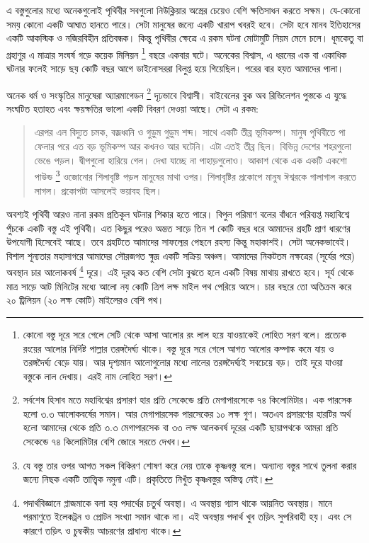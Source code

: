 \documentclass[
]{book}
\begin{document}
এ বস্তুগুলোর মধ্যে অনেকগুলোই পৃথিবীর সবগুলো নিউক্লিয়ার অস্ত্রের চেয়েও বেশি ক্ষতিসাধন করতে সক্ষম। যে-কোনো সময় কোনো একটি আঘাত হানতে পারে। সেটা মানুষের জন্যে একটি খারাপ খবরই হবে। সেটা হবে মানব ইতিহাসের একটি আকস্মিক ও নজিরবিহীন প্রতিবন্ধক। কিন্তু পৃথিবীর ক্ষেত্রে এ রকম ঘটনা মোটামুটি নিয়ম মেনে চলে। ধূমকেতু বা গ্রহাণুর এ মাত্রার সংঘর্ষ গড়ে কয়েক মিলিয়ন \footnote{কোনো বস্তু দূরে সরে গেলে সেটি থেকে আসা আলোর রং লাল হয়ে যাওয়াকেই লোহিত সরণ বলে। প্রত্যেক রংয়ের আলোর নির্দিষ্ট পাল্লার তরঙ্গদৈর্ঘ্য থাকে। বস্তু দূরে সরে গেলে আগত আলোর কম্পাঙ্ক কমে যায় ও তরঙ্গদৈর্ঘ্য বেড়ে যায়। আর দৃশ্যমান আলোগুলোর মধ্যে লালের তরঙ্গদৈর্ঘ্যই সবচেয়ে বড়। তাই দূরে যাওয়া বস্তুকে লাল দেখায়। এরই নাম লোহিত সরণ।} বছরে একবার ঘটে। অনেকের বিশ্বাস, এ ধরনের এক বা একাধিক ঘটনার ফলেই সাড়ে ছয় কোটি বছর আগে ডাইনোসররা বিলুপ্ত হয়ে গিয়েছিল। পরের বার হয়ত আমাদের পালা।

অনেক ধর্ম ও সংস্কৃতির মানুষেরা অ্যারমাগেডন \footnote{সর্বশেষ হিসাব মতে মহাবিশ্বের প্রসারণ হার প্রতি সেকেন্ডে প্রতি মেগাপারসেকে ৭৪ কিলোমিটার। এক পারসেক হলো ৩.৩ আলোকবর্ষের সমান। আর মেগাপারসেক পারসেকের ১০ লক্ষ গুণ। অতএব প্রসারণের হারটির অর্থ হলো আমাদের থেকে প্রতি ৩.৩ মেগাপারসেক বা ৩৩ লক্ষ আলকবর্ষ দূরের একটি ছায়াপথকে আমরা প্রতি সেকেন্ডে ৭৪ কিলোমিটার বেশি জোরে সরতে দেখব।} দৃঢ়ভাবে বিশ্বাসী। বাইবেলের বুক অব রিভিলেশন পুস্তকে এ যুদ্ধে সংঘটিত হতাহত এবং ক্ষয়ক্ষতির ভালো একটি বিবরণ দেওয়া আছে। সেটা এ রকম:

\begin{quote}
এরপর এল বিদ্যুত চমক, বজ্রধ্বনি ও গুড়ুম গুড়ুম শব্দ। সাথে একটি তীব্র ভূমিকম্প। মানুষ পৃথিবীতে পা ফেলার পরে এত বড় ভূমিকম্প আর কখনও আর ঘটেনি। এটা এতই তীব্র ছিল। বিভিন্ন দেশের শহরগুলো ভেঙে পড়ল। দ্বীপগুলো হারিয়ে গেল। দেখা যাচ্ছে না পাহাড়গুলোও। আকাশ থেকে এক একটি একশো পাউন্ড \footnote{যে বস্তু তার ওপর আগত সকল বিকিরণ শোষণ করে নেয় তাকে কৃষ্ণবস্তু বলে। অন্যান্য বস্তুর সাথে তুলনা করার জন্যে নিছক একটি তাত্ত্বিক নমুনা এটি। প্রকৃতিতে নিখুঁত কৃষ্ণবস্তুর অস্তিত্ব নেই।} ওজোনোর শিলাবৃষ্টি পড়ল মানুষের মাথা ওপর। শিলাবৃষ্টির প্রকোপে মানুষ ঈশ্বরকে গালাগাল করতে লাগল। প্রকোপটা আসলেই ভয়াবহ ছিল।
\end{quote}

অবশ্যই পৃথিবী আরও নানা রকম প্রতিকূল ঘটনার শিকার হতে পারে। বিপুল পরিমাণ বলের বাঁধনে পরিব্যপ্ত মহাবিশ্বে পুঁচকে একটি বস্তু এই পৃথিবী। এত কিছুর পরেও অন্তত সাড়ে তিন শ কোটি বছর ধরে আমাদের গ্রহটি প্রাণ ধারণের উপযোগী হিসেবেই আছে। তবে গ্রহটিতে আমাদের সাফল্যের পেছনে রহস্য কিন্তু মহাকাশই। সেটা অনেকভাবেই। বিশাল শূন্যতার মহাসাগরে আমাদের সৌরজগত ক্ষুদ্র একটি সক্রিয় অঞ্চল। আমাদের নিকটতম নক্ষত্রের (সূর্যের পরে) অবস্থান চার আলোকবর্ষ \footnote{পদার্থবিজ্ঞানে প্লাজমাকে বলা হয় পদার্থের চতুর্থ অবস্থা। এ অবস্থায় গ্যাস থাকে আয়নিত অবস্থায়। মানে পরমাণুতে ইলেকট্রন ও প্রোটন সংখ্যা সমান থাকে না। এই অবস্থায় পদার্থ খুব তড়িৎ সুপরিবাহী হয়। এবং সে কারণে তড়িৎ ও চুম্বকীয় আচরণের প্রাধান্য থাকে।} দূরে। এই দূরত্ব কত বেশি সেটা বুঝতে হলে একটি বিষয় মাথায় রাখতে হবে। সূর্য থেকে মাত্র সাড়ে আট মিনিটের মধ্যে আলো নয় কোটি ত্রিশ লক্ষ মাইল পথ পেরিয়ে আসে। চার বছরে তো অতিক্রম করে ২০ ট্রিলিয়ন (২০ লক্ষ কোটি) মাইলেরও বেশি পথ।
\end{document}
